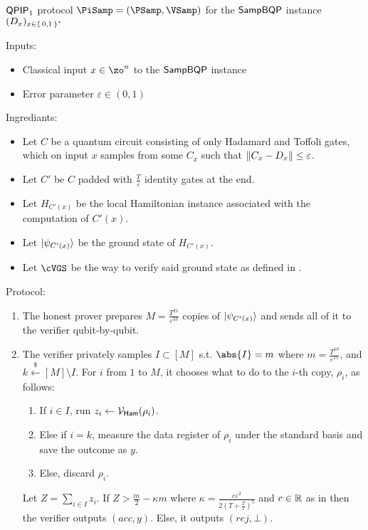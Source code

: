 \begin{protocol}{$\operatorname{\mathsf{QPIP}}_1$ protocol $\PiSamp=(\PSamp, \VSamp)$ for the $\operatorname{\mathsf{SampBQP}}$ instance $(D_x)_{x\in\set{0, 1}^*}$}
	\label{ProtoQPIP1}

	Inputs: 
	\begin{itemize}
		\item Classical input $x\in\zo^n$ to the $\operatorname{\mathsf{SampBQP}}$ instance
		\item Error parameter $\varepsilon\in(0, 1)$
	\end{itemize}

	Ingrediants:
	\begin{itemize}
		\item Let $C$ be a quantum circuit consisting of only Hadamard and Toffoli gates, which on input $x$ samples from some $C_x$ such that $\left\lVert C_x-D_x\right\rVert\leq\varepsilon$.
		\item Let $C'$ be $C$ padded with $\frac{T}{\varepsilon}$ identity gates at the end. 
		\item Let $H_{C'(x)}$ be the local Hamiltonian instance associated with the computation of $C'(x)$.
		\item Let $\ket{\psi_{C'(x)}}$ be the ground state of $H_{C'(x)}$.
		\item Let $\cVGS$ be the way to verify said ground state as defined in . 
	\end{itemize}

	Protocol:
	\begin{enumerate}
		\item\label{step:qpip1-state-gen} The honest prover prepares $M=\frac{T^{21}}{\varepsilon^{33}}$ copies of $\ket{\psi_{C'(x)}}$ and sends all of it to the verifier qubit-by-qubit.
		\item\label{step:qpip1-verify} The verifier privately samples $I\subset[M]$ s.t. $\abs{I}=m$ where $m=\frac{T^{10}}{\varepsilon^{15}}$, and $k\xleftarrow{\$}[M]\setminus I$. 
			For $i$ from $1$ to $M$, it chooses what to do to the $i$-th copy, $\rho_i$, as follows:
		\begin{enumerate}
			\item If $i\in I$, run $z_i\leftarrow\mathcal{V}_{\mathsf{Ham}}(\rho_i)$.
			\item Else if $i=k$, measure the data register  of $\rho_i$ under the standard basis and save the outcome as $y$.
			\item Else, discard $\rho_i$.
		\end{enumerate}
			Let $Z=\sum_{i\in I} z_i$. If $Z>\frac{m}{2}-\kappa m$ where $\kappa=\frac{c\varepsilon^2}{2\left(T+\frac{T}{\varepsilon}\right)^5}$ and $c\in\mathbb{R}$ as in  then the verifier outputs $(acc, y)$. Else, it outputs $(rej, \bot)$.
	\end{enumerate}
\end{protocol}

